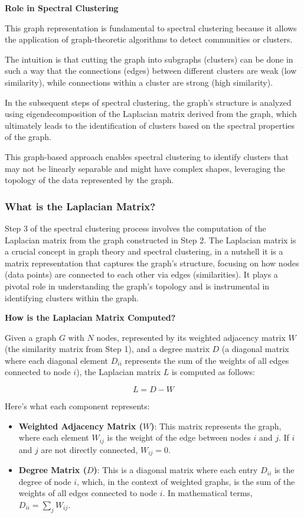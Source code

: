 \documentclass[11pt]{article}
\begin{document}
    \textbf{Role in Spectral Clustering}

This graph representation is fundamental to spectral clustering because
it allows the application of graph-theoretic algorithms to detect
communities or clusters.

The intuition is that cutting the graph into subgraphs (clusters) can be
done in such a way that the connections (edges) between different
clusters are weak (low similarity), while connections within a cluster
are strong (high similarity).

In the subsequent steps of spectral clustering, the graph's structure is
analyzed using eigendecomposition of the Laplacian matrix derived from
the graph, which ultimately leads to the identification of clusters
based on the spectral properties of the graph.

This graph-based approach enables spectral clustering to identify
clusters that may not be linearly separable and might have complex
shapes, leveraging the topology of the data represented by the graph.

    \subsubsection{What is the Laplacian
Matrix?}\label{what-is-the-laplacian-matrix}

Step 3 of the spectral clustering process involves the computation of
the Laplacian matrix from the graph constructed in Step 2. The Laplacian
matrix is a crucial concept in graph theory and spectral clustering, in
a nutshell it is a matrix representation that captures the graph's
structure, focusing on how nodes (data points) are connected to each
other via edges (similarities). It plays a pivotal role in understanding
the graph's topology and is instrumental in identifying clusters within
the graph.

    \textbf{How is the Laplacian Matrix Computed?}

Given a graph \(G\) with \(N\) nodes, represented by its weighted
adjacency matrix \(W\) (the similarity matrix from Step 1), and a degree
matrix \(D\) (a diagonal matrix where each diagonal element \(D_{ii}\)
represents the sum of the weights of all edges connected to node \(i\)),
the Laplacian matrix \(L\) is computed as follows:

\[ L = D - W \]

Here's what each component represents:

\begin{itemize}
\item
  \textbf{Weighted Adjacency Matrix (\(W\))}: This matrix represents the
  graph, where each element \(W_{ij}\) is the weight of the edge between
  nodes \(i\) and \(j\). If \(i\) and \(j\) are not directly connected,
  \(W_{ij} = 0\).
\item
  \textbf{Degree Matrix (\(D\))}: This is a diagonal matrix where each
  entry \(D_{ii}\) is the degree of node \(i\), which, in the context of
  weighted graphs, is the sum of the weights of all edges connected to
  node \(i\). In mathematical terms, \(D_{ii} = \sum_{j} W_{ij}\).
\end{itemize}
\end{document}
